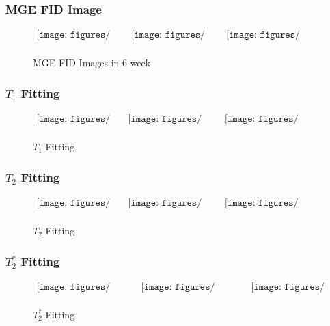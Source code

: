 \documentclass{beamer}
\begin{document}
	\begin{frame}
		\frametitle{MGE FID Image}
		\begin{figure}
			$\begin{array}{ccc}
				\texttt{[image: figures/MGE\_6week/mge\_6week\_1.png]}
				&
				\texttt{[image: figures/MGE\_6week/mge\_6week\_8.png]}
				&
				\texttt{[image: figures/MGE\_6week/mge\_6week\_15.png]}
				\\
				\end{array}$
			\caption{MGE FID Images in 6 week}
		\end{figure}
	\end{frame}

	\begin{frame}
		\frametitle{$T_1$ Fitting}
		\begin{figure}
			$\begin{array}{ccc}
			\texttt{[image: figures/T1\_fit/T1\_6week\_fit.png]}
			&
			\texttt{[image: figures/T1\_fit/T1\_4month\_fit.png]}
			&
			\texttt{[image: figures/T1\_fit/T1\_20month\_fit.png]}
			\\
			\end{array}$
			\caption{$T_1$ Fitting}
		\end{figure}
	\end{frame}

	\begin{frame}
		\frametitle{$T_2$ Fitting}
		\begin{figure}
			$\begin{array}{ccc}
			\texttt{[image: figures/T2\_fit/T2\_6week\_fit.png]}
			&
			\texttt{[image: figures/T2\_fit/T2\_4month\_fit.png]}
			&
			\texttt{[image: figures/T2\_fit/T2\_20month\_fit.png]}
			\\
			\end{array}$
			\caption{$T_2$ Fitting}
		\end{figure}
	\end{frame}

	\begin{frame}
		\frametitle{$T_2^*$ Fitting}
		\begin{figure}
			$\begin{array}{ccc}
			\texttt{[image: figures/T2star\_fit/T2star\_6week\_fit.png]}
			&
			\texttt{[image: figures/T2star\_fit/T2star\_4month\_fit.png]}
			&
			\texttt{[image: figures/T2star\_fit/T2star\_20month\_fit.png]}
			\\
			\end{array}$
			\caption{$T_2^*$ Fitting}
		\end{figure}
	\end{frame}
\end{document}
